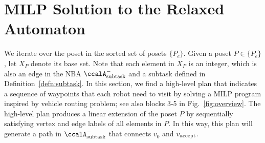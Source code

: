 \documentclass[Afour,sageh,times]{sagej}
\newtheorem{exmp}{Example}
\newcommand{\auto}[1]{\ccalA_{\textup{#1}}}
\newcommand{\vertex}[1]{v_{\textup{#1}}}
\newenvironment{cexmp}
{\addtocounter{exmp}{-1}\begin{exmp}}
  {\end{exmp}}
\begin{document}
\section{MILP Solution to the Relaxed Automaton}\label{sec:solution}
We iterate over the poset in the  sorted set of posets $\{P_e\}$. Given a poset $P\in \{P_e\}$, let $X_{P}$ denote its base set. Note that each element in $X_P$ is an integer, which is also an edge in the NBA $\auto{subtask}^-$ and a subtask defined in Definition~\ref{defn:subtask}. In this section, we find a high-level plan that indicates  a sequence of waypoints that each robot need to visit by solving a MILP program inspired by vehicle routing problem; see also blocks 3-5 in Fig.~\ref{fig:overview}. The high-level plan produces a linear extension of the poset $P$ by sequentially satisfying vertex and edge labels of all elements in $P$. In this way,  this plan will generate a path in $\auto{subtask}^-$ that connects $v_0$ and $\vertex{accept}$.
\end{document}
